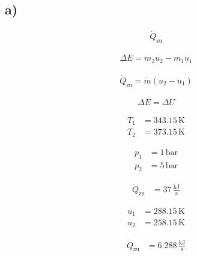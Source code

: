 

\subsection*{a)}

\begin{align*}
\dot{Q}_{\text{zu}} 
\end{align*}

\begin{align*}
\Delta E = m_2 u_2 - m_1 u_1
\end{align*}

\begin{align*}
\dot{Q}_{\text{zu}} = \dot{m} (u_2 - u_1)
\end{align*}

\begin{align*}
\Delta E = \Delta U
\end{align*}

\begin{align*}
T_1 &= 343.15 \, \text{K} \\
T_2 &= 373.15 \, \text{K}
\end{align*}

\begin{align*}
p_1 &= 1 \, \text{bar} \\
p_2 &= 5 \, \text{bar}
\end{align*}

\begin{align*}
\dot{Q}_{\text{zu}} &= 37 \, \frac{\text{kJ}}{\text{s}}
\end{align*}

\begin{align*}
u_1 &= 288.15 \, \text{K} \\
u_2 &= 258.15 \, \text{K}
\end{align*}

\begin{align*}
\dot{Q}_{\text{zu}} &= 6.288 \, \frac{\text{kJ}}{\text{s}}
\end{align*}